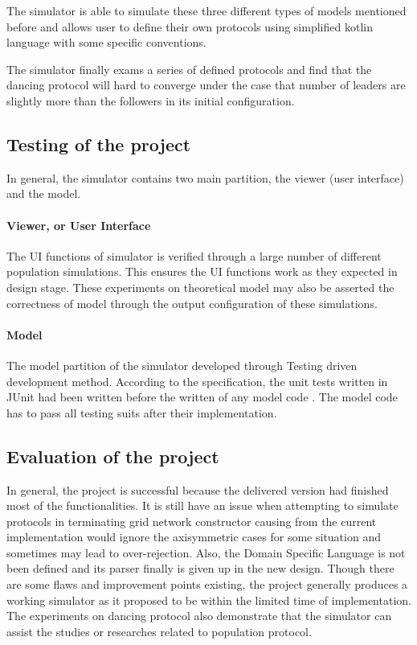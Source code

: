 \par\noindent
The simulator is able to simulate these three different types of models mentioned before and allows user to define their own protocols using simplified
kotlin language with some specific conventions.

\par\noindent
The simulator finally exams a series of defined protocols and find that the dancing protocol will hard to converge under the case that number of leaders are slightly more than the followers
in its initial configuration.

\subsection{Testing of the project}

\par\noindent
In general, the simulator contains two main partition, the viewer (user interface) and the model.

\paragraph{Viewer, or User Interface} The UI functions of simulator is verified through a large number of different population simulations. This ensures the UI functions work as they expected in design stage.
These experiments on theoretical model may also be asserted the correctness of model through the output configuration of these simulations.

\paragraph{Model} The model partition of the simulator developed through Testing driven development method. According to the specification, the unit tests written in JUnit \cite{JUnit} had been written before the written of any
model code . The model code has to pass all testing suits after their implementation.

\subsection{Evaluation of the project}
In general, the project is successful because the delivered version had finished most of the functionalities. It is still have an issue when
attempting to simulate protocols in terminating grid network constructor causing from the current implementation would ignore the axisymmetric cases for some situation and sometimes may lead to
over-rejection. Also, the Domain Specific Language is not been defined and its parser finally is given up in the new design. Though there are some flaws and improvement points existing, the project generally produces a working simulator as it
proposed to be within the limited time of implementation. The experiments on dancing protocol also demonstrate that the simulator can assist the studies or researches
related to population protocol.
